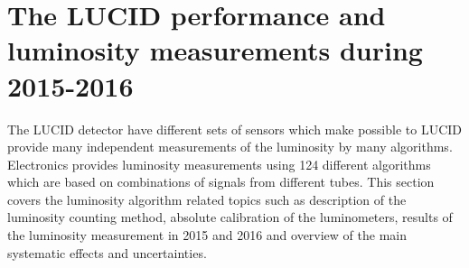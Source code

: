\section{The LUCID performance and luminosity measurements during 2015-2016}

The LUCID detector have different sets of sensors which make possible to LUCID provide many independent measurements of the luminosity by many algorithms.
Electronics provides luminosity measurements using 124 different algorithms which are based on combinations of signals from different tubes.
This section covers the luminosity algorithm related topics such as description of the luminosity counting method, absolute calibration of the luminometers, 
results of the luminosity measurement in 2015 and 2016 and overview of the main systematic effects and uncertainties.





